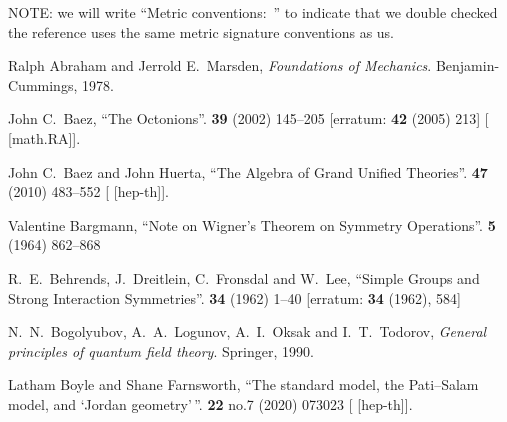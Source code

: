 
\begin{thebibliography}{99}
  \def\usesOurConventions{Metric conventions:~\checkmark} %

  \item[]
NOTE: we will write ``\usesOurConventions'' to indicate that we double
checked the reference uses the same metric signature conventions as us.

Ralph Abraham and Jerrold E.\ Marsden,
\textit{Foundations of Mechanics}.
Benjamin-Cummings, 1978. %

  
John C.~Baez,
``The Octonions''.
 \textbf{39} (2002) 145--205
[erratum:  \textbf{42} (2005) 213]
{\tt{}}
[ [math.RA]].
  
John C.~Baez and John Huerta,
``The Algebra of Grand Unified Theories''.
 \textbf{47} (2010) 483--552
{\tt{}}
[ [hep-th]].

Valentine Bargmann,
``Note on Wigner's Theorem on Symmetry Operations''.
 \textbf{5} (1964) 862--868
{\tt{}}

R.~E.~Behrends, J.~Dreitlein, C.~Fronsdal and W.~Lee,
``Simple Groups and Strong Interaction Symmetries''.
 \textbf{34} (1962) 1--40
[erratum:  \textbf{34} (1962), 584]
{\tt{}}

N.~N.~Bogolyubov, A.~A.~Logunov, A.~I.~Oksak and I.~T.~Todorov,
\textit{General principles of quantum field theory}.
Springer, 1990.

Latham Boyle and Shane Farnsworth,
``The standard model, the Pati--Salam model, and `Jordan geometry'\,''.
 \textbf{22} no.7 (2020) 073023
{\tt{}}
[ [hep-th]].


\end{thebibliography}

